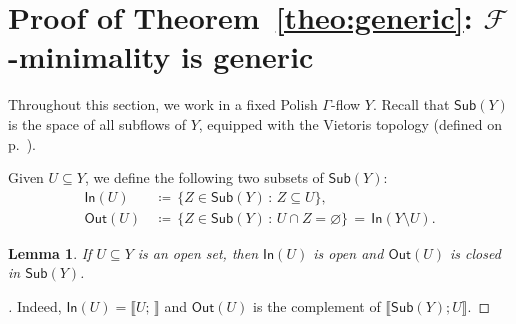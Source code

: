 \documentclass[11pt,reqno,psamsfonts]{amsart}
\theoremstyle{bfnote}
\newtheorem{lemma}[theo]{Lemma}
\theoremstyle{definition}
\theoremstyle{remark}
\newcommand{\0}{\varnothing}
\newcommand{\set}[1]{\{#1\}}
\newcommand{\defeq}{\coloneqq}
\newcommand{\red}[1]{{\color{red}#1}}
\newcommand{\todo}[1]{\red{\textbf{\upshape{[#1]}}}}
\newcommand{\emphd}[1]{{\fontseries{b}\selectfont\textsf{#1}}}
\newcommand{\G}{\Gamma}
\newcommand{\N}{\mathbb{N}}
\newcommand{\Sub}{\mathsf{Sub}}
\newcommand{\In}{\mathsf{In}}
\newcommand{\Out}{\mathsf{Out}}
\numberwithin{equation}{section}
\newenvironment{scproof}[1][]{\begin{proof}[\textsc{\upshape{Proof}}#1]}{\end{proof}}
\begin{document}
    \section{Proof of Theorem~\ref{theo:generic}: $\mathcal{F}$-minimality is generic}\label{sec:generic}

    Throughout this section, we work in a fixed Polish $\G$-flow $Y$. Recall that $\Sub(Y)$ is the space of all subflows of $Y$, equipped with the Vietoris topology (defined on p.~\pageref{page:Vietoris}).  %
    


    
    Given $U \subseteq Y$, we define the following two subsets of $\Sub(Y)$:
    \begin{align*}
        \In(U) \,&\defeq\, \set{Z \in \Sub(Y) \,:\, Z \subseteq U},\\
        \Out(U) \,&\defeq\, \set{Z \in \Sub(Y) \,:\, U \cap Z = \0} \,=\, \In(Y \setminus U).
    \end{align*}

    \begin{lemma}\label{lemma:in-n-out}
        If $U \subseteq Y$ is an open set, then $\In(U)$ is open and $\Out(U)$ is closed in $\Sub(Y)$.
    \end{lemma}
    \begin{scproof}
        Indeed, $\In(U) = \llbracket U;\,\rrbracket$ and $\Out(U)$ is the complement of $\llbracket \Sub(Y); U\rrbracket$.
    \end{scproof}
    
\end{document}
